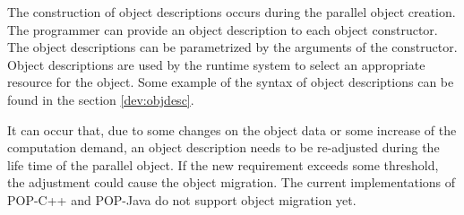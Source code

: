 The construction of object descriptions occurs during the parallel
object creation. The programmer can provide an object description to
each object constructor. The object descriptions can be parametrized by
the arguments of the constructor. Object descriptions are used by the
runtime system to select an appropriate resource for the object. Some example 
of the syntax of object descriptions can be found in the section \ref{dev:objdesc}.\s

It can occur that, due to some changes on the object data or some
increase of the computation demand, an object description needs to be
re-adjusted during the life time of the parallel object. If the new
requirement exceeds some threshold, the adjustment could cause the
object migration. The current implementations of POP-C++ and POP-Java do not support
object migration yet.
